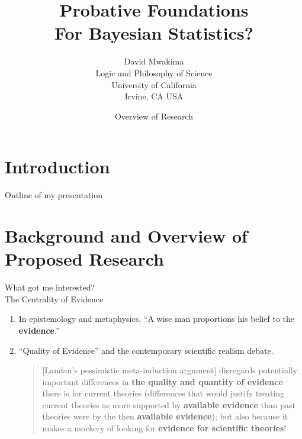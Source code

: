 \documentclass{beamer}
\title{Probative Foundations \\
		For Bayesian Statistics?}
\author{David Mwakima \\
		Logic and Philosophy of Science\\
		University of California\\
		Irvine, CA USA}
\date{Overview of Research}
\begin{document}
\begin{frame}
\maketitle
\end{frame}

\section{Introduction}

 \begin{frame}{Outline of my presentation}
        \tableofcontents
    \end{frame}
    
\section{Background and Overview of Proposed Research}

\begin{frame}{What got me interested? \\ The Centrality of Evidence}
        \begin{enumerate}
        \item In epistemology and metaphysics, ``A wise man proportions his belief to the \textbf{evidence}.'' \citet{Hume1748}
        \vfill
        \item ``Quality of Evidence'' and the contemporary scientific realism debate.
\vfill
\begin{quote}
              
[Laudan's pessimistic meta-induction argument] disregards potentially important differences in \textbf{the quality and quantity of evidence} there is for current theories (differences that would justify treating current theories as more supported by \textbf{available evidence} than past theories were by the then \textbf{available evidence}); but also because it makes a mockery of looking for \textbf{evidence for scientific theories}! 

\citet{Psillos2018}
\end{quote}

\end{enumerate}

\end{frame}
\end{document}
